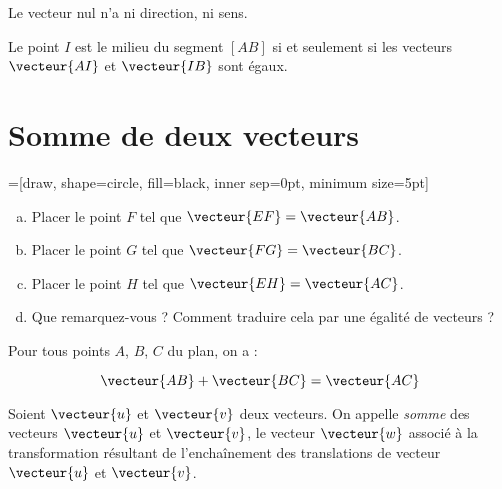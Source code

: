 \begin{remarque}
  Le vecteur nul n'a ni direction, ni sens.
\end{remarque}

\begin{propriete}
  Le point $I$ est le milieu du segment $[AB]$ si et seulement si les vecteurs $\vecteur{AI}$ et $\vecteur{IB}$ sont égaux.
\end{propriete}

\section{Somme de deux vecteurs}

\begin{activite}
=[draw, shape=circle, fill=black, inner sep=0pt, minimum size=5pt]

\begin{enumerate}[(a)]
  \item Placer le point $F$ tel que $\vecteur{EF}=\vecteur{AB}$.
  \item Placer le point $G$ tel que $\vecteur{FG}=\vecteur{BC}$.
  \item Placer le point $H$ tel que $\vecteur{EH}=\vecteur{AC}$.
  \item Que remarquez-vous ? Comment traduire cela par une égalité de vecteurs ?
\end{enumerate}
\end{activite}

\begin{propriete}
  Pour tous points $A$, $B$, $C$ du plan, on a :

\[\vecteur{AB}+\vecteur{BC}=\vecteur{AC}\]
\end{propriete}

\begin{definition}
  Soient $\vecteur{u}$ et $\vecteur{v}$ deux vecteurs. On appelle
  \emph{somme} des vecteurs $\vecteur{u}$ et $\vecteur{v}$, le vecteur
  $\vecteur{w}$ associé à la transformation résultant de l'enchaînement des
    translations de vecteur $\vecteur{u}$ et $\vecteur{v}$.
  \end{definition}

